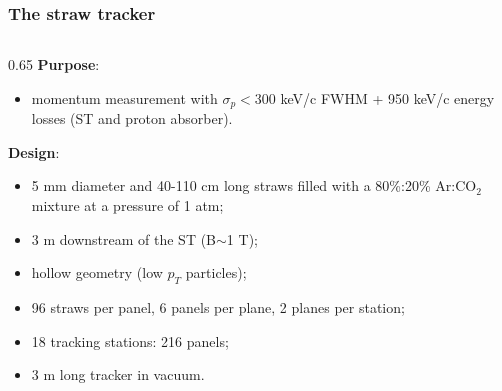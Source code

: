\documentclass{beamer}
\begin{document}
\begin{frame}
    \frametitle{The straw tracker}
    \begin{columns}
    \begin{column}{0.65 \framewidth}
\textbf{Purpose}:
\begin{itemize}
\item momentum measurement with $\sigma_p<300$ keV/c FWHM + 950 keV/c energy losses (ST and proton absorber). 
\end{itemize}
\textbf{Design}:
\begin{itemize}
   
    \item 5 mm diameter and 40-110 cm long straws filled with a 80\%:20\% Ar:CO$_2$ mixture at a pressure of 1 atm;
    \item 3 m downstream of the ST (B$\sim$1 T);
    \item hollow geometry (low $p_T $ particles);
    \item 96 straws per panel, 6 panels per plane, 2 planes per station;
        \item 18 tracking stations: 216 panels;
        \item 3 m long tracker in vacuum.
       
        
        
    \end{itemize}
    

\end{column}
\end{columns}
\end{frame}
\end{document}
